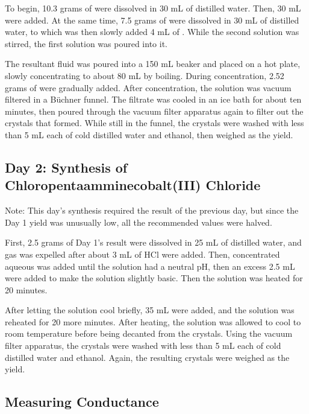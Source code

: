 \documentclass{article}
\begin{document}
To begin, 10.3 grams of  were dissolved in 30 mL of distilled water. Then, 30 mL  were added. At the same time, 7.5 grams of  were dissolved in 30 mL of distilled water, to which was then slowly added 4 mL of . While the second solution was stirred, the first solution was poured into it.

The resultant fluid was poured into a 150 mL beaker and placed on a hot plate, slowly concentrating to about 80 mL by boiling. During concentration, 2.52 grams of  were gradually added. After concentration, the solution was vacuum filtered in a B\"{u}chner funnel. The filtrate was cooled in an ice bath for about ten minutes, then poured through the vacuum filter apparatus again to filter out the crystals that formed. While still in the funnel, the crystals were washed with less than 5 mL each of cold distilled water and ethanol, then weighed as the yield.

\subsection{Day 2: Synthesis of Chloropentaamminecobalt(III) Chloride}

\begin{small}
Note: This day's synthesis required the result of the previous day, but since the Day 1 yield was unusually low, all the recommended values were halved.
\end{small}

First, 2.5 grams of Day 1's result were dissolved in 25 mL of distilled water, and  gas was expelled after about 3 mL of HCl were added. Then, concentrated aqueous  was added until the solution had a neutral pH, then an excess 2.5 mL were added to make the solution slightly basic. Then the solution was heated for 20 minutes.

After letting the solution cool briefly, 35 mL  were added, and the solution was reheated for 20 more minutes. After heating, the solution was allowed to cool to room temperature before being decanted from the crystals. Using the vacuum filter apparatus, the crystals were washed with less than 5 mL each of cold distilled water and ethanol. Again, the resulting crystals were weighed as the yield.

\subsection{Measuring Conductance}
\end{document}
